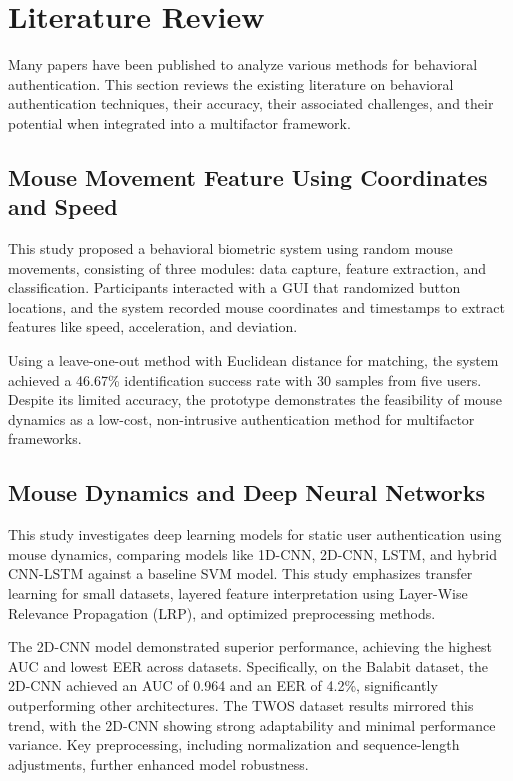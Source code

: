 \section{Literature Review}
\label{sec:literature-review}

Many papers have been published to analyze various methods for behavioral authentication. This section reviews the existing literature on behavioral authentication techniques, their accuracy, their associated challenges, and their potential when integrated into a multifactor framework.

\subsection{Mouse Movement Feature Using Coordinates and Speed}
\label{subsec:mouse-movement-feature-using-coordinates-and-speed}

\parencite{21_Mouse_Coordinate_Speed} This study proposed a behavioral biometric system using random mouse movements, consisting of three modules: data capture, feature extraction, and classification. Participants interacted with a GUI that randomized button locations, and the system recorded mouse coordinates and timestamps to extract features like speed, acceleration, and deviation.

Using a leave-one-out method with Euclidean distance for matching, the system achieved a 46.67\% identification success rate with 30 samples from five users. Despite its limited accuracy, the prototype demonstrates the feasibility of mouse dynamics as a low-cost, non-intrusive authentication method for multifactor frameworks.

\subsection{Mouse Dynamics and Deep Neural Networks}

\parencite{20_Mouse_Coordinate} This study investigates deep learning models for static user authentication using mouse dynamics, comparing models like 1D-CNN, 2D-CNN, LSTM, and hybrid CNN-LSTM against a baseline SVM model. This study emphasizes transfer learning for small datasets, layered feature interpretation using Layer-Wise Relevance Propagation (LRP), and optimized preprocessing methods.

The 2D-CNN model demonstrated superior performance, achieving the highest AUC and lowest EER across datasets. Specifically, on the Balabit dataset, the 2D-CNN achieved an AUC of 0.964 and an EER of 4.2\%, significantly outperforming other architectures. The TWOS dataset results mirrored this trend, with the 2D-CNN showing strong adaptability and minimal performance variance. Key preprocessing, including normalization and sequence-length adjustments, further enhanced model robustness.

